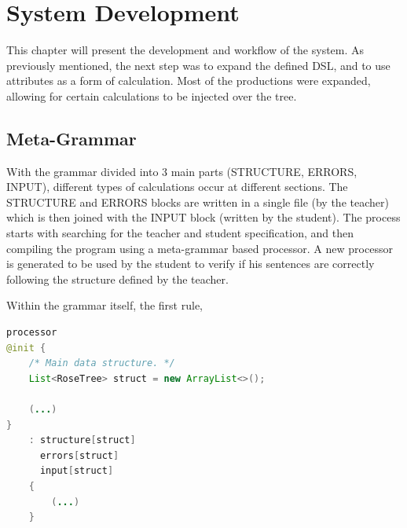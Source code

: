 \chapter{System Development} \label{system_development}

This chapter will present the development and workflow of the system. 
As previously mentioned, the next step was to expand the defined DSL, and to use attributes as a form of calculation. 
Most of the productions were expanded, allowing for certain calculations to be injected over the tree.


\section{Meta-Grammar}

With the grammar divided into 3 main parts (STRUCTURE, ERRORS, INPUT), different types of calculations occur at different sections. The STRUCTURE and ERRORS blocks are written in a single file (by the teacher) which is then joined 
with the INPUT block (written by the student). The process starts with searching for the teacher and student specification, and then compiling the program using a meta-grammar based processor. A new processor is generated to be 
used by the student to verify if his sentences are correctly following the structure defined by the teacher.

Within the grammar itself, the first rule, 
\newpage

%

\begin{center}
\begin{minipage}{11cm}
\begin{lstlisting}[language=java, basicstyle=\small, label={lst:processor}, caption=Processor rule from the meta-grammar]
processor
@init {
    /* Main data structure. */
    List<RoseTree> struct = new ArrayList<>();

    (...)
}
    : structure[struct]
      errors[struct]
      input[struct]
    {
        (...)
    }
\end{lstlisting}
\end{minipage}
\end{center}

